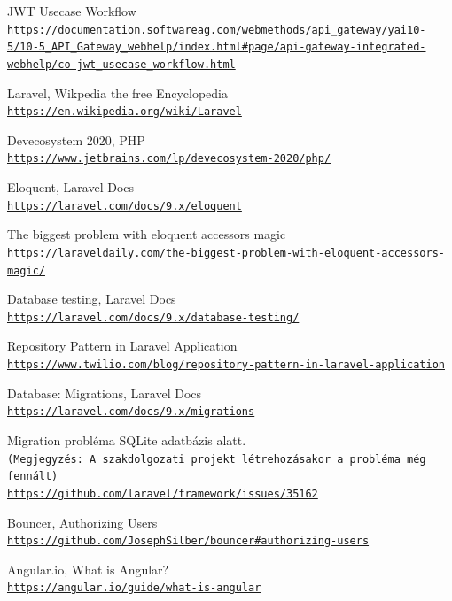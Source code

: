 \documentclass[a4paper,12pt]{thesis-ekf}
\theoremstyle{definition}
\begin{document}
\begin{thebibliography}{2}
    JWT Usecase Workflow
    \\\texttt{\url{https://documentation.softwareag.com/webmethods/api_gateway/yai10-5/10-5_API_Gateway_webhelp/index.html\#page/api-gateway-integrated-webhelp/co-jwt_usecase_workflow.html}}
    
    Laravel, Wikpedia the free Encyclopedia
    \\\texttt{\url{https://en.wikipedia.org/wiki/Laravel}}
    
    Devecosystem 2020, PHP
    \\\texttt{\url{https://www.jetbrains.com/lp/devecosystem-2020/php/}}
     
    Eloquent, Laravel Docs
    \\\texttt{\url{https://laravel.com/docs/9.x/eloquent}}
    
    The biggest problem with eloquent accessors magic
    \\\texttt{\url{https://laraveldaily.com/the-biggest-problem-with-eloquent-accessors-magic/}}
    
    Database testing, Laravel Docs
    \\\texttt{\url{https://laravel.com/docs/9.x/database-testing/}}
    
    Repository Pattern in Laravel Application
    \\\texttt{\url{https://www.twilio.com/blog/repository-pattern-in-laravel-application}}
    
    Database: Migrations, Laravel Docs
    \\\texttt{\url{https://laravel.com/docs/9.x/migrations}}
    
    Migration probléma SQLite adatbázis alatt. 
    \\\texttt{(Megjegyzés: A szakdolgozati projekt létrehozásakor a probléma még fennált)}
    \\\texttt{\url{https://github.com/laravel/framework/issues/35162}}
    
    Bouncer, Authorizing Users
    \\\texttt{\url{https://github.com/JosephSilber/bouncer\#authorizing-users}}
    
    Angular.io, What is Angular?
    \\\texttt{\url{https://angular.io/guide/what-is-angular}}
    

\end{thebibliography}
\end{document}
